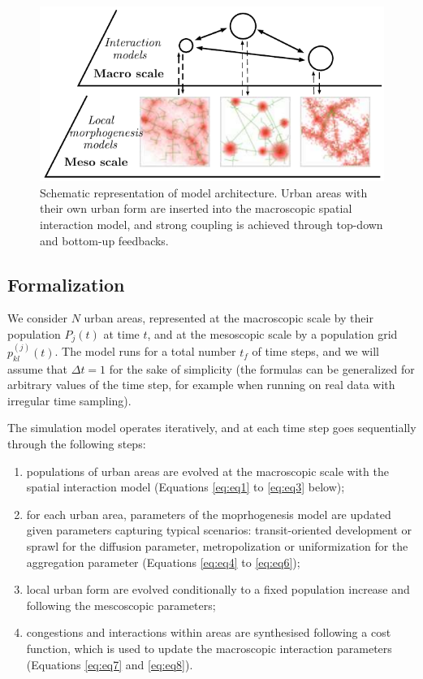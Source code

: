 \documentclass[ijgi,article,submit,moreauthors,pdftex]{Definitions/mdpi}
\begin{document}
\begin{figure}[H]
 \includegraphics[width=\linewidth]{figures/multiscale_morph.pdf}
 \caption{Schematic representation of model architecture. Urban areas with their own urban form are inserted into the macroscopic spatial interaction model, and strong coupling is achieved through top-down and bottom-up feedbacks.\label{fig:fig1}}
\end{figure}

\subsection{Formalization}


We consider $N$ urban areas, represented at the macroscopic scale by their population $P_j(t)$ at time $t$, and at the mesoscopic scale by a population grid $p_{kl}^{(j)}(t)$. The model runs for a total number $t_f$ of time steps, and we will assume that $\Delta t = 1$ for the sake of simplicity (the formulas can be generalized for arbitrary values of the time step, for example when running on real data with irregular time sampling).

The simulation model operates iteratively, and at each time step goes sequentially through the following steps:
\begin{enumerate}
	\item populations of urban areas are evolved at the macroscopic scale with the spatial interaction model (Equations \ref{eq:eq1} to \ref{eq:eq3} below);
	\item for each urban area, parameters of the moprhogenesis model are updated given parameters capturing typical scenarios: transit-oriented development or sprawl for the diffusion parameter, metropolization or uniformization for the aggregation parameter (Equations \ref{eq:eq4} to \ref{eq:eq6});
	\item local urban form are evolved conditionally to a fixed population increase and following the mescoscopic parameters;
	\item congestions and interactions within areas are synthesised following a cost function, which is used to update the macroscopic interaction parameters (Equations \ref{eq:eq7} and \ref{eq:eq8}).
\end{enumerate}
\end{document}
